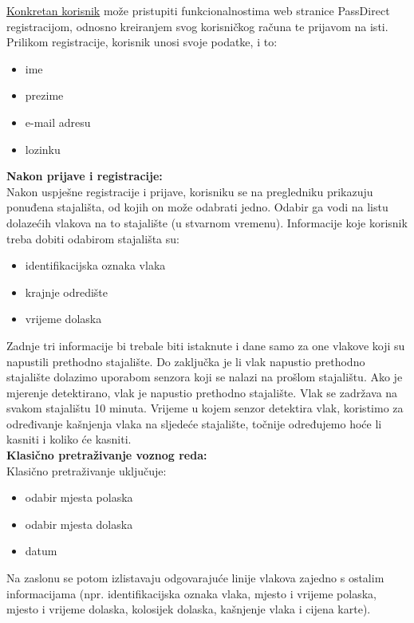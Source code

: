     \underline{Konkretan korisnik} može pristupiti funkcionalnostima web stranice PassDirect registracijom, odnosno kreiranjem svog korisničkog računa te prijavom na isti.\\ Prilikom registracije, korisnik unosi svoje podatke, i to:
    \begin{itemize}
        \item ime
        \item prezime 
        \item e-mail adresu 
        \item lozinku\\
    \end{itemize} 
    
 

\textbf{Nakon prijave i registracije:}\\
Nakon uspješne registracije i prijave, korisniku se na pregledniku prikazuju ponuđena stajališta, od kojih on može odabrati jedno. Odabir ga vodi na listu dolazećih vlakova na to stajalište (u stvarnom vremenu). Informacije koje korisnik treba dobiti odabirom stajališta su: 
\begin{itemize}
    \item identifikacijska oznaka vlaka
    \item krajnje odredište
    \item vrijeme dolaska\\
\end{itemize}
Zadnje tri informacije bi trebale biti istaknute i dane samo za one vlakove koji su napustili prethodno stajalište.  Do zaključka je li vlak napustio prethodno stajalište dolazimo uporabom senzora koji se nalazi na prošlom stajalištu. Ako je mjerenje detektirano, vlak je napustio prethodno stajalište. Vlak se zadržava na svakom stajalištu 10 minuta. Vrijeme u kojem senzor detektira vlak, koristimo za određivanje kašnjenja vlaka na sljedeće stajalište, točnije određujemo hoće li kasniti i koliko će kasniti.\\



\textbf{Klasično pretraživanje voznog reda:}\\
Klasično pretraživanje uključuje:
\begin{itemize}
    \item odabir mjesta polaska
    \item odabir mjesta dolaska
    \item datum\\
\end{itemize}
Na zaslonu se potom  izlistavaju odgovarajuće linije vlakova zajedno s ostalim informacijama (npr. identifikacijska oznaka vlaka, mjesto i vrijeme polaska, mjesto i vrijeme dolaska, kolosijek dolaska, kašnjenje vlaka i cijena karte). \\

